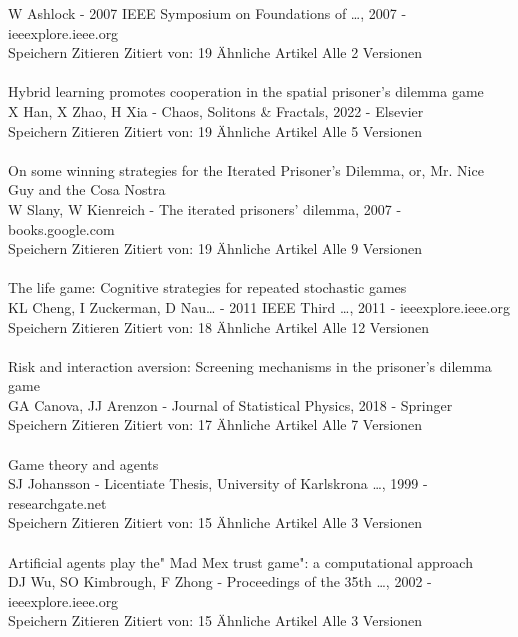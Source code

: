 \documentclass[11pt]{article}
\begin{document}
W Ashlock - 2007 IEEE Symposium on Foundations of …, 2007 - ieeexplore.ieee.org\\
Speichern Zitieren Zitiert von: 19 Ähnliche Artikel Alle 2 Versionen\\
\\
\noindent 
[HTML] Hybrid learning promotes cooperation in the spatial prisoner's dilemma game\\
X Han, X Zhao, H Xia - Chaos, Solitons \& Fractals, 2022 - Elsevier\\
Speichern Zitieren Zitiert von: 19 Ähnliche Artikel Alle 5 Versionen\\
\\
\noindent 
On some winning strategies for the Iterated Prisoner's Dilemma, or, Mr. Nice Guy and the Cosa Nostra\\
W Slany, W Kienreich - The iterated prisoners' dilemma, 2007 - books.google.com\\
Speichern Zitieren Zitiert von: 19 Ähnliche Artikel Alle 9 Versionen\\
\\
\noindent 
The life game: Cognitive strategies for repeated stochastic games\\
KL Cheng, I Zuckerman, D Nau… - 2011 IEEE Third …, 2011 - ieeexplore.ieee.org\\
Speichern Zitieren Zitiert von: 18 Ähnliche Artikel Alle 12 Versionen\\
\\
\noindent 
Risk and interaction aversion: Screening mechanisms in the prisoner's dilemma game\\
GA Canova, JJ Arenzon - Journal of Statistical Physics, 2018 - Springer\\
Speichern Zitieren Zitiert von: 17 Ähnliche Artikel Alle 7 Versionen\\
\\
\noindent 
[PDF] Game theory and agents\\
SJ Johansson - Licentiate Thesis, University of Karlskrona …, 1999 - researchgate.net\\
Speichern Zitieren Zitiert von: 15 Ähnliche Artikel Alle 3 Versionen\\
\\
\noindent 
Artificial agents play the" Mad Mex trust game": a computational approach\\
DJ Wu, SO Kimbrough, F Zhong - Proceedings of the 35th …, 2002 - ieeexplore.ieee.org\\
Speichern Zitieren Zitiert von: 15 Ähnliche Artikel Alle 3 Versionen\\
\end{document}
